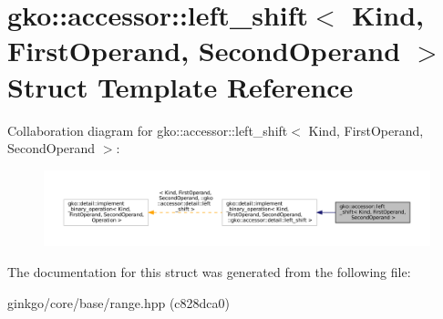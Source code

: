 \hypertarget{structgko_1_1accessor_1_1left__shift}{}\section{gko\+:\+:accessor\+:\+:left\+\_\+shift$<$ Kind, First\+Operand, Second\+Operand $>$ Struct Template Reference}
\label{structgko_1_1accessor_1_1left__shift}


Collaboration diagram for gko\+:\+:accessor\+:\+:left\+\_\+shift$<$ Kind, First\+Operand, Second\+Operand $>$\+:
\nopagebreak
\begin{figure}[H]
\begin{center}
\leavevmode
\includegraphics[width=350pt]{structgko_1_1accessor_1_1left__shift__coll__graph}
\end{center}
\end{figure}


The documentation for this struct was generated from the following file\+:\begin{DoxyCompactItemize}
\item 
ginkgo/core/base/range.\+hpp (c828dca0)\end{DoxyCompactItemize}
